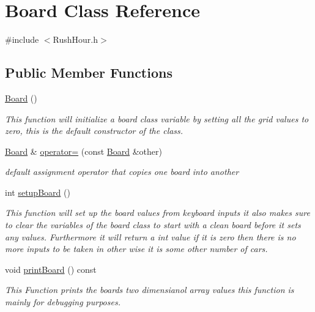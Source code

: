 \hypertarget{class_board}{}\section{Board Class Reference}
\label{class_board}


{\ttfamily \#include $<$Rush\+Hour.\+h$>$}

\subsection*{Public Member Functions}
\begin{DoxyCompactItemize}
\item 
\hyperlink{class_board_a9ee491d4fea680cf69b033374a9fdfcb}{Board} ()
\begin{DoxyCompactList}\small\item\em This function will initialize a board class variable by setting all the grid values to zero, this is the default constructor of the class. \end{DoxyCompactList}\item 
\hyperlink{class_board}{Board} \& \hyperlink{class_board_ae6c8d66af1bb70e1d34a704321675975}{operator=} (const \hyperlink{class_board}{Board} \&other)
\begin{DoxyCompactList}\small\item\em default assignment operator that copies one board into another \end{DoxyCompactList}\item 
int \hyperlink{class_board_a1b06ea6dfdcb9d958abca88274b24199}{setup\+Board} ()
\begin{DoxyCompactList}\small\item\em This function will set up the board values from keyboard inputs it also makes sure to clear the variables of the board class to start with a clean board before it sets any values. Furthermore it will return a int value if it is zero then there is no more inputs to be taken in other wise it is some other number of cars. \end{DoxyCompactList}\item 
void \hyperlink{class_board_a58b38efec8c8ce21b55546da09685a3e}{print\+Board} () const 
\begin{DoxyCompactList}\small\item\em This Function prints the board\textquotesingle{}s two dimensianol array values this function is mainly for debugging purposes. \end{DoxyCompactList}\item 

\end{DoxyCompactItemize}
